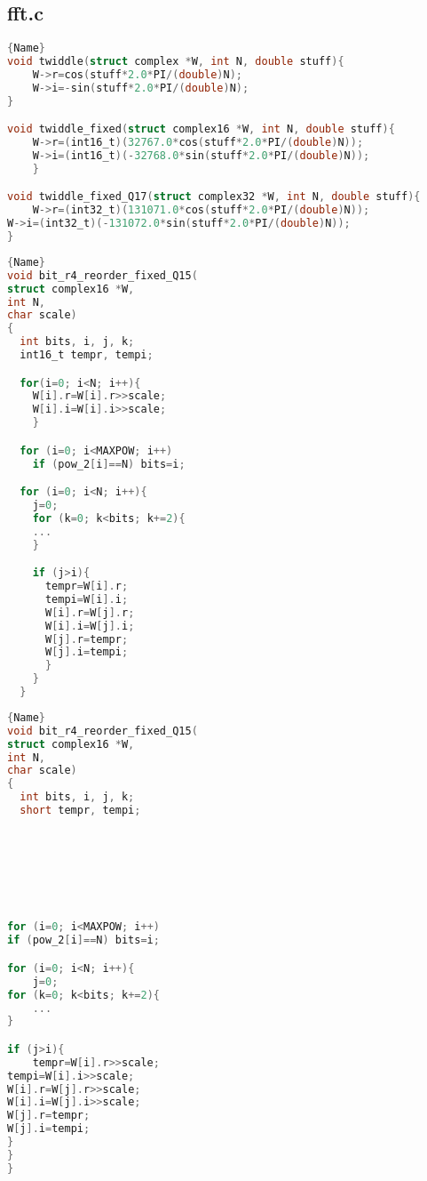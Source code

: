 \documentclass[a4paper]{article}
\begin{document}
\subsection{fft.c}
\begin{lstlisting}[caption=code 3,frame=tlrb, language=C]{Name}
void twiddle(struct complex *W, int N, double stuff){
    W->r=cos(stuff*2.0*PI/(double)N);
    W->i=-sin(stuff*2.0*PI/(double)N);
}

void twiddle_fixed(struct complex16 *W, int N, double stuff){
    W->r=(int16_t)(32767.0*cos(stuff*2.0*PI/(double)N));
    W->i=(int16_t)(-32768.0*sin(stuff*2.0*PI/(double)N));
    }

void twiddle_fixed_Q17(struct complex32 *W, int N, double stuff){
    W->r=(int32_t)(131071.0*cos(stuff*2.0*PI/(double)N));
W->i=(int32_t)(-131072.0*sin(stuff*2.0*PI/(double)N));
}
\end{lstlisting}

\noindent\begin{minipage}{.45\textwidth}
    \begin{lstlisting}[caption=code 4,frame=tlrb, language=C]{Name}
void bit_r4_reorder_fixed_Q15(
struct complex16 *W,
int N,
char scale)
{
  int bits, i, j, k;
  int16_t tempr, tempi;

  for(i=0; i<N; i++){
    W[i].r=W[i].r>>scale;
	W[i].i=W[i].i>>scale;
	}

  for (i=0; i<MAXPOW; i++)
  	if (pow_2[i]==N) bits=i;

  for (i=0; i<N; i++){
  	j=0;
   	for (k=0; k<bits; k+=2){
   	...
   	}

	if (j>i){
	  tempr=W[i].r;
	  tempi=W[i].i;
	  W[i].r=W[j].r;
	  W[i].i=W[j].i;
	  W[j].r=tempr;
	  W[j].i=tempi;
	  }
	}
  }
    \end{lstlisting}
\end{minipage}\hfill
\begin{minipage}{.45\textwidth}
    \begin{lstlisting}[caption=code 5,frame=tlrb, language=C]{Name}
void bit_r4_reorder_fixed_Q15(
struct complex16 *W,
int N,
char scale)
{
  int bits, i, j, k;
  short tempr, tempi;







for (i=0; i<MAXPOW; i++)
if (pow_2[i]==N) bits=i;

for (i=0; i<N; i++){
    j=0;
for (k=0; k<bits; k+=2){
    ...
}

if (j>i){
    tempr=W[i].r>>scale;
tempi=W[i].i>>scale;
W[i].r=W[j].r>>scale;
W[i].i=W[j].i>>scale;
W[j].r=tempr;
W[j].i=tempi;
}
}
}

    \end{lstlisting}
\end{minipage}
\end{document}
